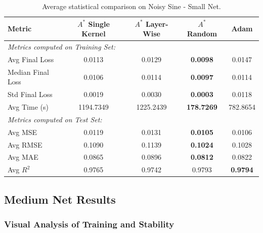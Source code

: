 \begin{table}[htbp]
\centering
\scriptsize
\begin{tabular}{|l|c|c|c|c|}
\hline
\textbf{Metric}   & \textbf{$A^*$ Single Kernel} & \textbf{$A^*$ Layer-Wise} & \textbf{$A^*$ Random} & \textbf{Adam} \\ \hline
\multicolumn{5}{|l|}{\textit{Metrics computed on Training Set:}} \\ \hline
Avg Final Loss          & 0.0113                       & 0.0129                    & \textbf{0.0098}       & 0.0147        \\ 
Median Final Loss       & 0.0106                       & 0.0114                    & \textbf{0.0097}       & 0.0114        \\
Std Final Loss          & 0.0019                       & 0.0030                    & \textbf{0.0003}       & 0.0118        \\ \hline
Avg Time (s)            & 1194.7349                    & 1225.2439                 & \textbf{178.7269}     & 782.8654      \\ \hline
\multicolumn{5}{|l|}{\textit{Metrics computed on Test Set:}} \\ \hline
Avg MSE                 & 0.0119                       & 0.0131                    & \textbf{0.0105}       & 0.0106        \\ 
Avg RMSE                & 0.1090                       & 0.1139                    & \textbf{0.1024}       & 0.1028        \\ 
Avg MAE                 & 0.0865                       & 0.0896                    & \textbf{0.0812}       & 0.0822        \\ 
Avg $R^2$               & 0.9765                       & 0.9742                    & 0.9793                & \textbf{0.9794} \\ \hline
\end{tabular}
\caption{Average statistical comparison on Noisy Sine - Small Net.}
\label{tab:small_net_sine}
\end{table}

\newpage

\subsection{Medium Net Results}

\subsubsection{Visual Analysis of Training and Stability}

